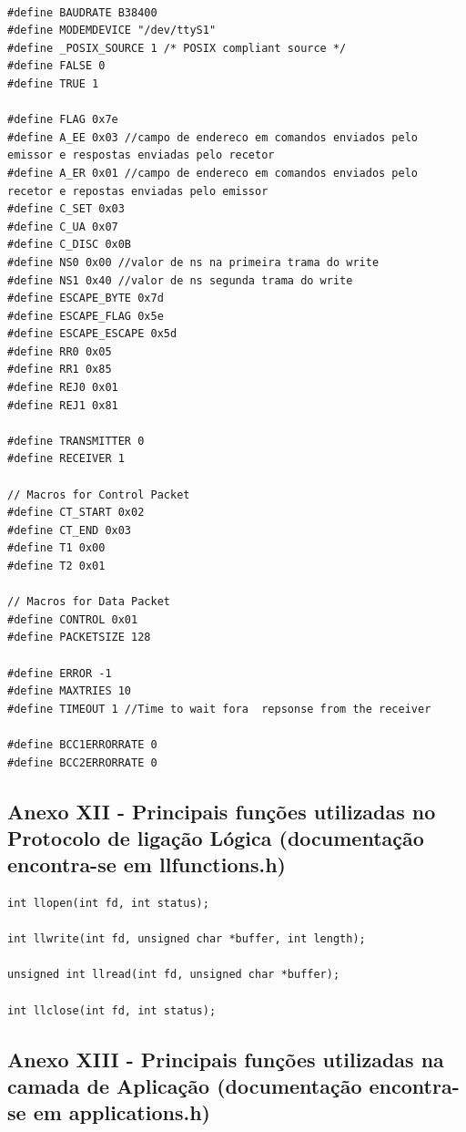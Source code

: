 \documentclass[11pt]{article}
\begin{document}
\begin{lstlisting}[style=CStyle]

#define BAUDRATE B38400
#define MODEMDEVICE "/dev/ttyS1"
#define _POSIX_SOURCE 1 /* POSIX compliant source */
#define FALSE 0
#define TRUE 1

#define FLAG 0x7e
#define A_EE 0x03 //campo de endereco em comandos enviados pelo emissor e respostas enviadas pelo recetor
#define A_ER 0x01 //campo de endereco em comandos enviados pelo recetor e repostas enviadas pelo emissor
#define C_SET 0x03
#define C_UA 0x07
#define C_DISC 0x0B
#define NS0 0x00 //valor de ns na primeira trama do write
#define NS1 0x40 //valor de ns segunda trama do write
#define ESCAPE_BYTE 0x7d 
#define ESCAPE_FLAG 0x5e
#define ESCAPE_ESCAPE 0x5d
#define RR0 0x05
#define RR1 0x85
#define REJ0 0x01
#define REJ1 0x81

#define TRANSMITTER 0 
#define RECEIVER 1

// Macros for Control Packet
#define CT_START 0x02
#define CT_END 0x03
#define T1 0x00
#define T2 0x01

// Macros for Data Packet
#define CONTROL 0x01
#define PACKETSIZE 128

#define ERROR -1
#define MAXTRIES 10
#define TIMEOUT 1 //Time to wait fora  repsonse from the receiver

#define BCC1ERRORRATE 0
#define BCC2ERRORRATE 0
\end{lstlisting}

\subsection{ Anexo XII - Principais funções utilizadas no Protocolo de ligação Lógica (documentação encontra-se em llfunctions.h)}

\begin{lstlisting}[style=CStyle]
int llopen(int fd, int status);

int llwrite(int fd, unsigned char *buffer, int length);

unsigned int llread(int fd, unsigned char *buffer);

int llclose(int fd, int status);
\end{lstlisting}

\pagebreak

\subsection{ Anexo XIII - Principais funções utilizadas na camada de Aplicação (documentação encontra-se em applications.h)}
\end{document}
